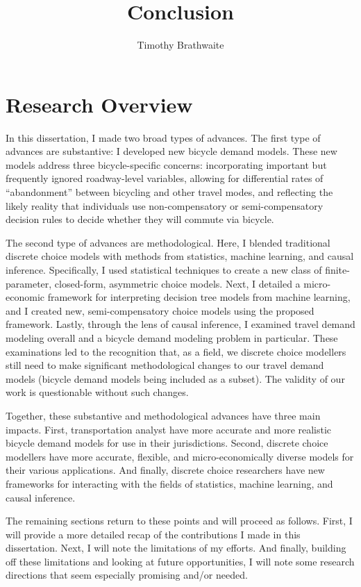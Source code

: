 \documentclass{article}
\title{Conclusion}
\author{Timothy Brathwaite}
\begin{document}
\maketitle

\section{Research Overview}
In this dissertation, I made two broad types of advances. The first type of advances are substantive: I developed new bicycle demand models. These new models address three bicycle-specific concerns: incorporating important but frequently ignored roadway-level variables, allowing for differential rates of ``abandonment'' between bicycling and other travel modes, and reflecting the likely reality that individuals use non-compensatory or semi-compensatory decision rules to decide whether they will commute via bicycle.

The second type of advances are methodological. Here, I blended traditional discrete choice models with methods from statistics, machine learning, and causal inference. Specifically, I used statistical techniques to create a new class of finite-parameter, closed-form, asymmetric choice models. Next, I detailed a micro-economic framework for interpreting decision tree models from machine learning, and I created new, semi-compensatory choice models using the proposed framework. Lastly, through the lens of causal inference, I examined travel demand modeling overall and a bicycle demand modeling problem in particular. These examinations led to the recognition that, as a field, we discrete choice modellers still need to make significant methodological changes to our travel demand models (bicycle demand models being included as a subset). The validity of our work is questionable without such changes.

Together, these substantive and methodological advances have three main impacts. First, transportation analyst have more accurate and more realistic bicycle demand models for use in their jurisdictions. Second, discrete choice modellers have more accurate, flexible, and micro-economically diverse models for their various applications. And finally, discrete choice researchers have new frameworks for interacting with the fields of statistics, machine learning, and causal inference.

The remaining sections return to these points and will proceed as follows. First, I will provide a more detailed recap of the contributions I made in this dissertation. Next, I will note the limitations of my efforts. And finally, building off these limitations and looking at future opportunities, I will note some research directions that seem especially promising and/or needed.
\end{document}
